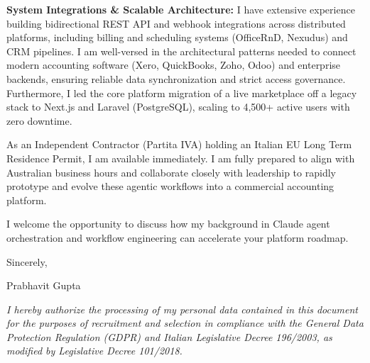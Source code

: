 \documentclass[11pt,a4paper]{article}
\begin{document}
\textbf{System Integrations \& Scalable Architecture:} I have extensive experience building bidirectional REST API and webhook integrations across distributed platforms, including billing and scheduling systems (OfficeRnD, Nexudus) and CRM pipelines. I am well-versed in the architectural patterns needed to connect modern accounting software (Xero, QuickBooks, Zoho, Odoo) and enterprise backends, ensuring reliable data synchronization and strict access governance. Furthermore, I led the core platform migration of a live marketplace off a legacy stack to Next.js and Laravel (PostgreSQL), scaling to 4,500+ active users with zero downtime.

As an Independent Contractor (Partita IVA) holding an Italian EU Long Term Residence Permit, I am available immediately. I am fully prepared to align with Australian business hours and collaborate closely with leadership to rapidly prototype and evolve these agentic workflows into a commercial accounting platform.

I welcome the opportunity to discuss how my background in Claude agent orchestration and workflow engineering can accelerate your platform roadmap.

Sincerely,

Prabhavit Gupta

\vspace{0.4em}
{\footnotesize \textit{I hereby authorize the processing of my personal data contained in this document for the purposes of recruitment and selection in compliance with the General Data Protection Regulation (GDPR) and Italian Legislative Decree 196/2003, as modified by Legislative Decree 101/2018.}\par}
\end{document}
